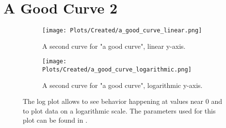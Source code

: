\section{A Good Curve 2}
\label{sec:appendixE:a_good_curve_2}

\begin{figure}[ht!]
    \centering
    \begin{subfigure}{1\linewidth}
        \centering
        \captionsetup{width=1\linewidth}
        \texttt{[image: Plots/Created/a\_good\_curve\_linear.png]}
        \caption{
            A second curve for "a good curve", linear y-axis. 
        }
        \label{fig:created:a_good_curve_linear_2}
    \end{subfigure}
    \hfill
    \begin{subfigure}{1\linewidth}
        \centering
        \captionsetup{width=1\linewidth}
        \texttt{[image: Plots/Created/a\_good\_curve\_logarithmic.png]}
        \caption{
            A second curve for "a good curve", logarithmic y-axis. 
        }
        \label{fig:created:a_good_curve_logarithmic_2}
    \end{subfigure}
    \caption{
        The log plot allows to see behavior happening at values near 0 and to plot data on a logarithmic scale. 
        The parameters used for this plot can be found in . 
    }
    \label{fig:created:a_good_curve_2}
\end{figure}

